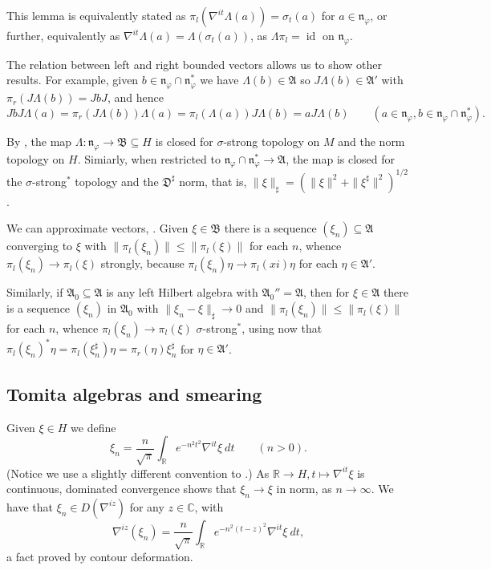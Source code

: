 \documentclass[a4paper,11pt]{article}
\theoremstyle{plain}
\theoremstyle{remark}
\newcommand{\mf}[1]{\mathfrak{#1}}
\newcommand{\id}{\operatorname{id}}
\begin{document}
This lemma is equivalently stated as $\pi_l(\nabla^{it}\Lambda(a)) = \sigma_{t}(a)$ for $a\in\mf n_\varphi$, or further, equivalently as $\nabla^{it}\Lambda(a) = \Lambda(\sigma_t(a))$, as $\Lambda\pi_l = \id$ on $\mf n_\varphi$.

The relation between left and right bounded vectors allows us to show other results.  For example, given $b\in\mf n_\varphi \cap \mf n_\varphi^*$ we have $\Lambda(b)\in \mf A$ so $J\Lambda(b) \in\mf A'$ with $\pi_r(J\Lambda(b)) = JbJ$, and hence
\[ JbJ\Lambda(a) = \pi_r(J\Lambda(b))\Lambda(a) = \pi_l(\Lambda(a))J\Lambda(b) = aJ\Lambda(b) \qquad (a\in\mf n_\varphi, b\in\mf n_\varphi \cap \mf n_\varphi^*). \]

By \cite[Proposition~VI.1.24]{TakesakiII}, the map $\Lambda \colon \mf n_\varphi \to \mf B \subseteq H$ is closed for $\sigma$-strong topology on $M$ and the norm topology on $H$.  Simiarly, when restricted to $\mf n_\varphi\cap\mf n_\varphi^* \to \mf A$, the map is closed for the $\sigma$-strong$^*$ topology and the $\mf D^\sharp$ norm, that is, $\|\xi\|_{\sharp} = (\|\xi\|^2 + \|\xi^\sharp\|^2)^{1/2}$.

We can approximate vectors, \cite[Theorem~VI.1.26]{TakesakiII}.  Given $\xi\in\mf B$ there is a sequence $(\xi_n)\subseteq\mf A$ converging to $\xi$ with $\|\pi_l(\xi_n)\| \leq \|\pi_l(\xi)\|$ for each $n$, whence $\pi_l(\xi_n) \to \pi_l(\xi)$ strongly, because $\pi_l(\xi_n)\eta \to \pi_l(xi)\eta$ for each $\eta\in\mf A'$.

Similarly, if $\mf A_0\subseteq\mf A$ is any left Hilbert algebra with $\mf A_0''=\mf A$, then for $\xi\in\mf A$ there is a sequence $(\xi_n)$ in $\mf A_0$ with $\|\xi_n-\xi\|_\sharp\to 0$ and $\|\pi_l(\xi_n)\| \leq \|\pi_l(\xi)\|$ for each $n$, whence $\pi_l(\xi_n) \to \pi_l(\xi)$ $\sigma$-strong$^*$, using now that $\pi_l(\xi_n)^*\eta = \pi_l(\xi_n^\sharp)\eta = \pi_r(\eta)\xi_n^\sharp$ for $\eta\in\mf A'$.


\subsection{Tomita algebras and smearing}

Given $\xi\in H$ we define
\[ \xi_n = \frac{n}{\sqrt\pi} \int_{\mathbb R} e^{-n^2t^2} \nabla^{it}\xi \ dt \qquad (n>0). \]
(Notice we use a slightly different convention to \cite{TakesakiII,StratilaZsido}.)  As $\mathbb R \to H, t\mapsto \nabla^{it}\xi$ is continuous, dominated convergence shows that $\xi_n \to \xi$ in norm, as $n\to\infty$.  We have that $\xi_n \in D(\nabla^{iz})$ for any $z\in\mathbb C$, with
\[ \nabla^{iz}(\xi_n) = \frac{n}{\sqrt\pi} \int_{\mathbb R} e^{-n^2(t-z)^2} \nabla^{it}\xi \ dt, \]
a fact proved by contour deformation.
\end{document}
